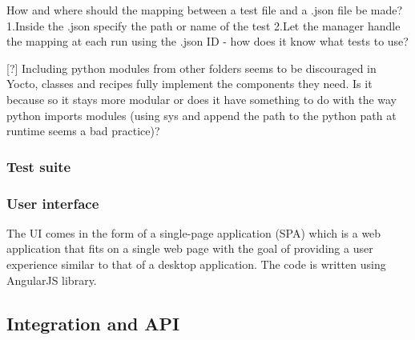 \documentclass{article}
\begin{document}
				How and where should the mapping between a test file and a .json file be made?
				1.Inside the .json specify the path or name of the test
				2.Let the manager handle the mapping at each run using the .json ID - how does it know what tests to use?

				[?] Including python modules from other folders seems to be discouraged in Yocto, classes and recipes fully implement the components they need. Is it because so it stays more modular or does it have something to do with the way python imports modules (using sys and append the path to the python path at runtime seems a bad practice)?

			\subsubsection{Test suite}


			\subsubsection{User interface}
				The UI comes in the form of a single-page application (SPA) which is a web application that fits on a single web page with the goal of providing a user experience similar to that of a desktop application. The code is written using AngularJS library.

		\subsection{Integration and API}
\end{document}
